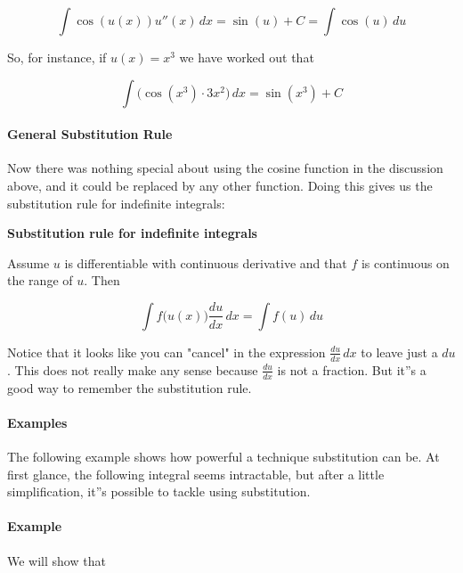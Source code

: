 $$\int \cos(u(x)) u''(x) \, dx = \sin(u) + C = \int \cos(u) \, du$$



So, for instance, if $u(x) = x^3$ we have worked out that



$$\int \bigl(\cos(x^3) \cdot 3x^2\bigr) \, dx = \sin(x^3) + C$$



\paragraph{General Substitution Rule}



Now there was nothing special about using the cosine function in the discussion above, and it could be replaced by any other function. Doing this gives us the substitution rule for indefinite integrals:



\textbf{Substitution rule for indefinite integrals}  

Assume $u$ is differentiable with continuous derivative and that $f$ is continuous on the range of $u$. Then



$$\int f\bigl(u(x)\bigr) \frac{du}{dx} \, dx = \int f(u) \, du$$



Notice that it looks like you can "cancel" in the expression $\frac{du}{dx} \, dx$ to leave just a $du$. This does not really make any sense because $\frac{du}{dx}$ is not a fraction. But it''s a good way to remember the substitution rule.



\paragraph{Examples}



The following example shows how powerful a technique substitution can be. At first glance, the following integral seems intractable, but after a little simplification, it''s possible to tackle using substitution.



\paragraph{Example}



We will show that



